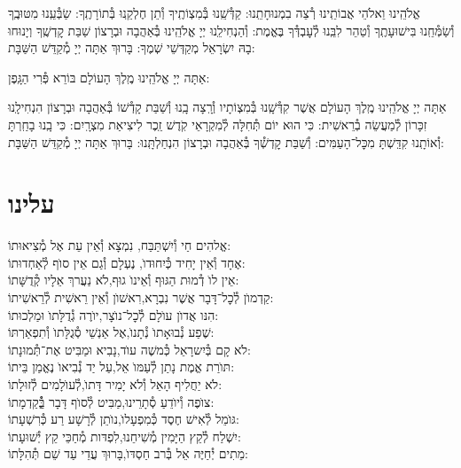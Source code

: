 \documentclass[twoside, openany, parskip=half, 11pt]{book}
\begin{document}
אֱלֹהֵֽינוּ וֵאלֹהֵי אֲבוֹתֵֽינוּ רְ֯צֵה בִמְנוּחָתֵֽנוּ: קַדְּ֯שֵֽׁנוּ בְּ֯מִצְוֹתֶֽיךָ וְ֯תֵן חֶלְקֵֽנוּ בְּ֯תוֹרָתֶֽךָ: שַׂבְּ֯עֵֽנוּ מִטּוּבֶֽךָ וְ֯שַׂמְּ֯חֵֽנוּ בִּישׁוּעָתֶֽךָ וְ֯טַהֵר לִבֵּֽנוּ לְ֯עׇבְדְּ֯ךָ בֶּאֱמֶת: וְ֯הַנְחִילֵֽנוּ יְיָ אֱלֹהֵֽינוּ בְּ֯אַהֲבָה וּבְרָצוֹן שַׁבַּת קׇדְשֶֽׁךָ וְיָנוּחוּ בָהּ יִשְׂרָאֵל מְקַדְּשֵׁי שְׁמֶךָ: בָּרוּךְ אַתָּה יְיָ מְ֯קַדֵּשׁ הַשַּׁבָּת:

\fullkaddish


אַתָּה יְיָ אֱלֹהֵֽינוּ מֶֽלֶךְ הָעוֹלָם בּוֹרֵא פְּ֯רִי הַגָּֽפֶן:

אַתָּה יְיָ אֱלֹהֵֽינוּ מֶֽלֶךְ הָעוֹלָם אֲשֶׁר קִדְּ֯שָֽׁנוּ בְּ֯מִצְוֹתָיו וְ֯רָֽצָה בָֽנוּ וְ֯שַׁבַּת קָדְ֯שׁוֹ בְּ֯אַהֲבָה וּבְרָצוֹן הִנְחִילָֽנוּ זִכָּרוֹן לְ֯מַעֲשֵׂה בְ֯רֵאשִׁית: כִּי הוּא יוֹם תְּ֯חִלָּה לְ֯מִקְרָאֵי קֹֽדֶשׁ זֵֽכֶר לִיצִיאַת מִצְרָֽיִם: כִּי בָֽנוּ בָחַֽרְתָּ וְ֯אוֹתָֽנוּ קִדַּֽשְׁתָּ מִכׇּל־הָעַמִּים: וְ֯שַׁבַּת קׇדְשְׁ֯ךָ בְּ֯אַהֲבָה וּבְרָצוֹן הִנְחַלְתָּֽנוּ: בָּרוּךְ אַתָּה יְיָ מְ֯קַדֵּשׁ הַשַּׁבָּת:



\section*{ עלינו }
\aleinu






אֱלהִים חַי וְ֯יִשְׁתַּבַּח, \hfill נִמְצָא וְ֯אֵין עֵת אֶל מְ֯צִיאוּתוֹ: \\
אֶחָד וְ֯אֵין יָחִיד כְּ֯יִחוּדוׂ, \hfill נֶעְלָם וְ֯גַם אֵין סוׂף לְ֯אַחְדוּתוֹ: \\
אֵין לוׂ דְ֯מוּת הַגּוּף וְ֯אֵינוׂ גוּף,\hfill לׂא נַעֲרךְ אֵלָיו קְ֯דֻשָּׁתוֹ: \\
קַדְמוׂן לְ֯כׇל־דָּבָר אֲשֶׁר נִבְרָא,\hfill רִאשׁוׂן וְ֯אֵין רֵאשִׁית לְ֯רֵאשִׁיתוֹ: \\
הִנּו אֲדוׂן עוׂלָם לְ֯כׇל־נוׂצָר,\hfill יוׂרֶה גְ֯דֻלָּתוׂ וּמַלְכוּתוֹ: \\
שֶׁפַע נְ֯בוּאָתוׂ נְ֯תָנוׂ,\hfill אֶל אַנְשֵׁי סְ֯גֻלָּתוׂ וְ֯תִפְאַרְתּוֹ: \\
לׂא קָם בְּ֯יִשרָאֵל כְּ֯משֶׁה עוׂד,\hfill נָבִיא וּמַבִּיט אֶת־תְּ֯מוּנָתוֹ: \\
תּוׂרַת אֱמֶת נָתַן לְ֯עַמּוׂ אֵל,\hfill עַל יַד נְ֯בִיאוׂ נֶאֱמַן בֵּיתוֹ: \\
לׂא יַחֲלִיף הָאֵל וְ֯לׂא יָמִיר דָּתוׂ,\hfill לְ֯עוׂלָמִים לְ֯זוּלָתוֹ: \\
צוׂפֶה וְ֯יוׂדֵעַ סְ֯תָרֵינוּ,\hfill מַבִּיט לְ֯סוׂף דָּבָר בְְַּ֯֯קַדְמָתוֹ: \\
גּוׂמֵל לְ֯אִישׁ חֶסֶד כְּ֯מִפְעָלוׂ,\hfill נוׂתֵן לְ֯רָשָׁע רַע כְּ֯רִשְׁעָתוֹ: \\
יִשְׁלַח לְ֯קֵץ הַיָּמִין מְ֯שִׁיחֵנוּ,\hfill לִפְדּות מְ֯חַכֵּי קֵץ יְ֯שׁוּעָתוֹ: \\
מֵתִים יְ֯חַיֶּה אֵל בְּ֯רב חַסְדּוׂ,\hfill בָּרוּךְ עֲדֵי עַד שֵׁם תְּ֯הִלָּתוֹ:\\
\end{document}
